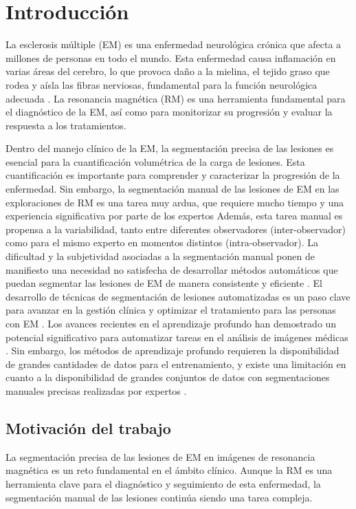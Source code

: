 \documentclass[../main.tex]{subfiles}
\begin{document}
\section{Introducción}
La esclerosis múltiple (EM) es una enfermedad neurológica crónica que afecta a millones de personas en todo el mundo. Esta enfermedad causa inflamación en varias áreas del cerebro, lo que provoca daño a la mielina, el tejido graso que rodea y aísla las fibras nerviosas, fundamental para la función neurológica adecuada \cite{rondinella2024icpr2024competitionmultiple}. La resonancia magnética (RM) es una herramienta fundamental para el diagnóstico de la EM, así como para monitorizar su progresión y evaluar la respuesta a los tratamientos.

Dentro del manejo clínico de la EM, la segmentación precisa de las lesiones es esencial para la cuantificación volumétrica de la carga de lesiones. Esta cuantificación es importante para comprender y caracterizar la progresión de la enfermedad. Sin embargo, la segmentación manual de las lesiones de EM en las exploraciones de RM es una tarea muy ardua, que requiere mucho tiempo y una experiencia significativa por parte de los expertos Además, esta tarea manual es propensa a la variabilidad, tanto entre diferentes observadores (inter-observador) como para el mismo experto en momentos distintos (intra-observador).
La dificultad y la subjetividad asociadas a la segmentación manual ponen de manifiesto una necesidad no satisfecha de desarrollar métodos automáticos que puedan segmentar las lesiones de EM de manera consistente y eficiente \cite{rondinella2024icpr2024competitionmultiple}
. El desarrollo de técnicas de segmentación de lesiones automatizadas es un paso clave para avanzar en la gestión clínica y optimizar el tratamiento para las personas con EM
.
Los avances recientes en el aprendizaje profundo han demostrado un potencial significativo para automatizar tareas en el análisis de imágenes médicas \cite{LUNDERVOLD2019102}
. Sin embargo, los métodos de aprendizaje profundo requieren la disponibilidad de grandes cantidades de datos para el entrenamiento, y existe una limitación en cuanto a la disponibilidad de grandes conjuntos de datos con segmentaciones manuales precisas realizadas por expertos \cite{LITJENS201760}. 

\subsection{Motivación del trabajo}
La segmentación precisa de las lesiones de EM en imágenes de resonancia magnética es un reto fundamental en el ámbito clínico. Aunque la RM es una herramienta clave para el diagnóstico y seguimiento de esta enfermedad, la segmentación manual de las lesiones continúa siendo una tarea compleja. 
\end{document}
